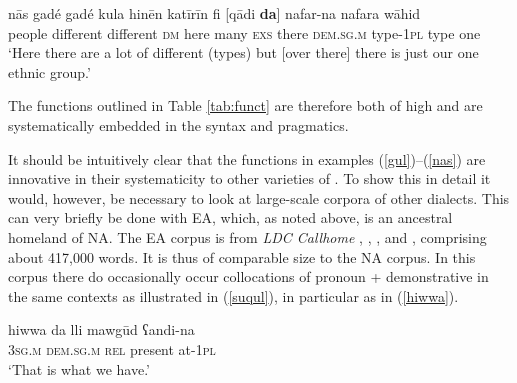 \documentclass[output=paper]{langsci/langscibook}
\begin{document}
\ea\label{nas}
\gll nās gadé gadé kula hinēn katīrīn fi [qādi \textbf{da}] nafar-na nafara wāhid\\
     people different different \textsc{dm} here many \textsc{exs} there \textsc{dem.sg.m} type-\textsc{1pl} type one\\
\glt ‘Here there are a lot of different (types) but [over there] there is just our one ethnic group.’
\z

The functions outlined in Table \ref{tab:funct} are therefore both of high  and are systematically embedded in the syntax and pragmatics.

It should be intuitively clear that the functions in examples (\ref{gul})–(\ref{nas}) are innovative in their systematicity  to other varieties of . To show this in detail it would, however, be necessary to look at large-scale corpora of other  dialects. This can very briefly be done with EA, which, as noted above, is an ancestral homeland of NA. The EA corpus is from \textit{LDC Callhome} \citep{Canavanetal1997}, \citet{Nakano1982}, \citet{BehnstedtWoidich1987}, and \citet{WoidichDrop2007}, comprising about 417,000 words. It is thus of comparable size to the NA corpus. In this corpus there do occasionally occur collocations of pronoun + demonstrative in the same contexts as illustrated in (\ref{suqul}), in particular as in (\ref{hiwwa}).


\ea\label{hiwwa}
\gll hiwwa da lli mawgūd ʕandi-na\\
     \textsc{3sg.m} \textsc{dem.sg.m} \textsc{rel} present at-1\textsc{pl}\\
\glt ‘That is what we have.’
\z
\end{document}
